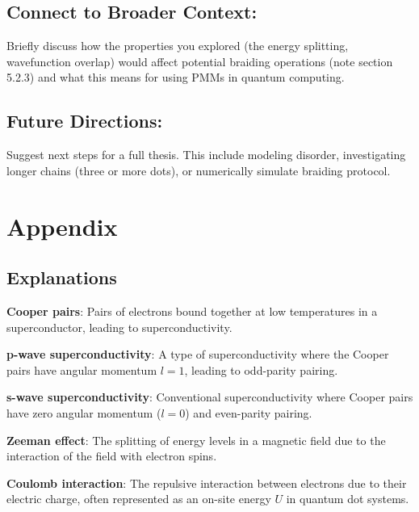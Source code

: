 \documentclass[11pt, letterpaper, titlepage]{article}
\begin{document}
\subsection{Connect to Broader Context:} Briefly discuss how the properties you explored (the energy splitting, wavefunction overlap) would affect potential braiding operations (note section 5.2.3) and what this means for using PMMs in quantum computing.\par
\subsection{Future Directions:} Suggest next steps for a full thesis. This include modeling disorder, investigating longer chains (three or more dots), or numerically simulate braiding protocol.

\newpage
\section{Appendix}
\subsection{Explanations}

\textbf{Cooper pairs}: Pairs of electrons bound together at low temperatures in a superconductor, leading to superconductivity.

\textbf{p-wave superconductivity}: A type of superconductivity where the Cooper pairs have angular momentum \(l=1\), leading to odd-parity pairing.  

\textbf{s-wave superconductivity}: Conventional superconductivity where Cooper pairs have zero angular momentum (\(l=0\)) and even-parity pairing.  

\textbf{Zeeman effect}: The splitting of energy levels in a magnetic field due to the interaction of the field with electron spins.  

\textbf{Coulomb interaction}: The repulsive interaction between electrons due to their electric charge, often represented as an on-site energy \(U\) in quantum dot systems.
\end{document}
